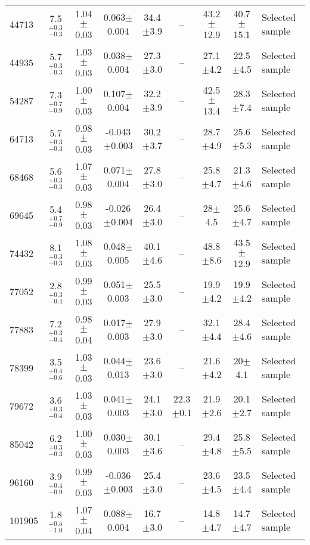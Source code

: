 \begin{table*}
\begin{tabular}{lcccccccl}
44713 &   7.5$_{-0.3}^{+0.3}$   &   1.04$\pm$0.03   &   0.063$\pm$0.004   &   34.4$\pm$3.9   &   --   & 43.2$\pm$12.9 & 40.7$\pm$15.1 &   Selected sample \\ 
44935 &   5.7$_{-0.3}^{+0.3}$   &   1.03$\pm$0.03   &   0.038$\pm$0.004   &   27.3$\pm$3.0   &   --   & 27.1$\pm$4.2 & 22.5$\pm$4.5 &   Selected sample \\ 
54287 &   7.3$_{-0.9}^{+0.7}$   &   1.00$\pm$0.03   &   0.107$\pm$0.004   &   32.2$\pm$3.9   &   --   & 42.5$\pm$13.4 & 28.3$\pm$7.4 &   Selected sample \\ 
64713 &   5.7$_{-0.3}^{+0.3}$   &   0.98$\pm$0.03   &   -0.043$\pm$0.003   &   30.2$\pm$3.7   &   --   & 28.7$\pm$4.9 & 25.6$\pm$5.3 &   Selected sample \\ 
68468 &   5.6$_{-0.3}^{+0.3}$   &   1.07$\pm$0.03   &   0.071$\pm$0.004   &   27.8$\pm$3.0   &   --   & 25.8$\pm$4.7 & 21.3$\pm$4.6 &   Selected sample \\ 
69645 &   5.4$_{-0.9}^{+0.7}$   &   0.98$\pm$0.03   &   -0.026$\pm$0.004   &   26.4$\pm$3.0   &   --   & 28$\pm$4.5 & 25.6$\pm$4.7 &   Selected sample \\ 
74432 &   8.1$_{-0.3}^{+0.3}$   &   1.08$\pm$0.03   &   0.048$\pm$0.005   &   40.1$\pm$4.6   &   --   & 48.8$\pm$8.6 & 43.5$\pm$12.9 &   Selected sample \\ 
77052 &   2.8$_{-0.4}^{+0.3}$   &   0.99$\pm$0.03   &   0.051$\pm$0.003   &   25.5$\pm$3.0   &   --   & 19.9$\pm$4.2 & 19.9$\pm$4.2 &   Selected sample \\ 
77883 &   7.2$_{-0.4}^{+0.3}$   &   0.98$\pm$0.04   &   0.017$\pm$0.003   &   27.9$\pm$3.0   &   --   & 32.1$\pm$4.4 & 28.4$\pm$4.6 &   Selected sample \\ 
78399 &   3.5$_{-0.6}^{+0.4}$   &   1.03$\pm$0.03   &   0.044$\pm$0.013   &   23.6$\pm$3.0   &   --   & 21.6$\pm$4.2 & 20$\pm$4.1 &   Selected sample \\ 
79672 &   3.6$_{-0.4}^{+0.3}$   &   1.03$\pm$0.03   &   0.041$\pm$0.003   &   24.1$\pm$3.0   &   22.3$\pm$0.1   & 21.9$\pm$2.6 & 20.1$\pm$2.7 &   Selected sample \\ 
85042 &   6.2$_{-0.3}^{+0.3}$   &   1.00$\pm$0.03   &   0.030$\pm$0.003   &   30.1$\pm$3.6   &   --   & 29.4$\pm$4.8 & 25.8$\pm$5.5 &   Selected sample \\ 
96160 &   3.9$_{-0.9}^{+0.4}$   &   0.99$\pm$0.03   &   -0.036$\pm$0.003   &   25.4$\pm$3.0   &   --   & 23.6$\pm$4.5 & 23.5$\pm$4.4 &   Selected sample \\ 
101905 &   1.8$_{-1.0}^{+0.5}$   &   1.07$\pm$0.04   &   0.088$\pm$0.004   &   16.7$\pm$3.0   &   --   & 14.8$\pm$4.7 & 14.7$\pm$4.7 &   Selected sample \\ 

\end{tabular}
\end{table*}
